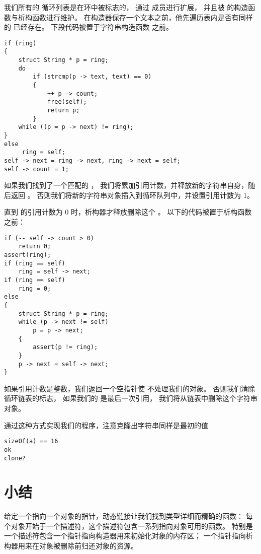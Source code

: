 我们所有的  循环列表是在环中被标志的，
通过  成员进行扩展，
并且被  的构造函数与析构函数进行维护。
在构造器保存一个文本之前，他先遍历表内是否有同样的  已经存在。
下段代码被置于字符串构造函数  之前。
\begin{lstlisting}
if (ring)
{    
    struct String * p = ring;
    do
        if (strcmp(p -> text, text) == 0)
        {
            ++ p -> count;
            free(self);
            return p;
        }
    while ((p = p -> next) != ring);
}
else
     ring = self;
self -> next = ring -> next, ring -> next = self;
self -> count = 1;
\end{lstlisting}

如果我们找到了一个匹配的 ，
我们将累加引用计数，并释放新的字符串自身，随后返回 。
否则我们将新的字符串对象插入到循环队列中，并设置引用计数为 1。

直到  的引用计数为 0 时，析构器才释放删除这个 。
以下的代码被置于析构函数  之前：
\begin{lstlisting}
if (-- self -> count > 0)
    return 0;
assert(ring);
if (ring == self)
    ring = self -> next;
if (ring == self)
    ring = 0;
else
{    
    struct String * p = ring;
    while (p -> next != self)
        p = p -> next;
    {
        assert(p != ring);
    }
    p -> next = self -> next;
}
\end{lstlisting}

如果引用计数是整数，我们返回一个空指针使
 不处理我们的对象。
否则我们清除循环链表的标志，
如果我们的  是最后一次引用，
我们将从链表中删除这个字符串对象。

通过这种方式实现我们的程序，注意克隆出字符串同样是最初的值 %
\begin{lstlisting}
sizeOf(a) == 16
ok
clone?
\end{lstlisting}

\section{小结}
\label{sec:dlSum}

给定一个指向一个对象的指针，动态链接让我们找到类型详细而精确的函数：
每个对象开始于一个描述符，这个描述符包含一系列指向对象可用的函数。
特别是一个描述符包含一个指针指向构造器用来初始化对象的内存区；
一个指针指向析构器用来在对象被删除前归还对象的资源。

